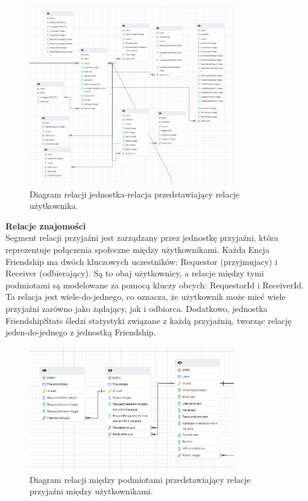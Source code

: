 \documentclass[12pt,a4paper]{article}
\begin{document}
\begin{figure}[h!]
    \centering
    \includegraphics[width=0.8\textwidth]{zdj/user_ERD.png}
    \caption{Diagram relacji jednostka-relacja przedstawiający relacje użytkownika.}
    
\end{figure}
\newpage

\textbf{Relacje znajomości}\\
Segment relacji przyjaźni jest zarządzany przez jednostkę przyjaźni, która reprezentuje połączenia społeczne między użytkownikami. Każda Encja Friendship ma dwóch kluczowych uczestników: Requestor (przyjmujacy) i Receiver (odbierający). Są to obaj użytkownicy, a relacje między tymi podmiotami są modelowane za pomocą kluczy obcych: RequestorId i ReceiverId. Ta relacja jest wiele-do-jednego, co oznacza, że użytkownik może mieć wiele przyjaźni zarówno jako żądający, jak i odbiorca. Dodatkowo, jednostka FriendshipStats śledzi statystyki związane z każdą przyjaźnią, tworząc relację jeden-do-jednego z jednostką Friendship.

\begin{figure}[h!]
    \centering
    \includegraphics[width=0.8\textwidth]{zdj/friendship_ERD.png}
    \caption{Diagram relacji między podmiotami przedstawiający relacje przyjaźni między użytkownikami.}
    
\end{figure}
\newpage
\end{document}

